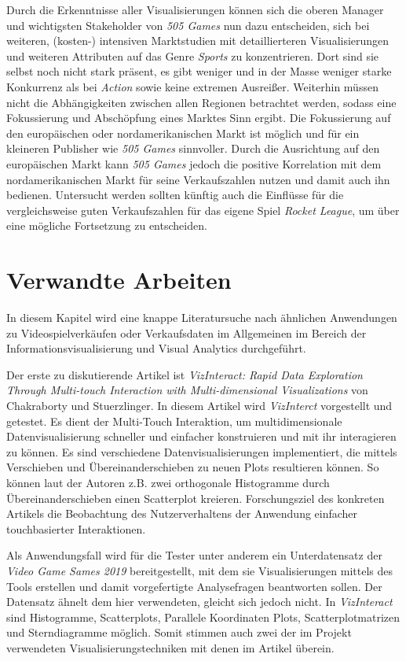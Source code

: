 \documentclass[usegeometry=true]{scrartcl}
\begin{document}
Durch die Erkenntnisse aller Visualisierungen können sich die oberen Manager und wichtigsten Stakeholder von \textit{505 Games} nun dazu entscheiden, sich bei weiteren, (kosten-) intensiven Marktstudien mit detaillierteren Visualisierungen und weiteren Attributen auf das Genre \textit{Sports} zu konzentrieren. 
Dort sind sie selbst noch nicht stark präsent, es gibt weniger und in der Masse weniger starke Konkurrenz als bei \textit{Action} sowie keine extremen Ausreißer. 
Weiterhin müssen nicht die Abhängigkeiten zwischen allen Regionen betrachtet werden, sodass eine Fokussierung und Abschöpfung eines Marktes Sinn ergibt. 
Die Fokussierung auf den europäischen oder nordamerikanischen Markt ist möglich und für ein kleineren Publisher wie \textit{505 Games} sinnvoller. 
Durch die Ausrichtung auf den europäischen Markt kann \textit{505 Games} jedoch die positive Korrelation mit dem nordamerikanischen Markt für seine Verkaufszahlen nutzen und damit auch ihn bedienen.
Untersucht werden sollten künftig auch die Einflüsse für die vergleichsweise guten Verkaufszahlen für das eigene Spiel \textit{Rocket League}, um über eine mögliche Fortsetzung zu entscheiden.
 
\section{Verwandte Arbeiten}
In diesem Kapitel wird eine knappe Literatursuche nach ähnlichen Anwendungen zu Videospielverkäufen oder Verkaufsdaten im Allgemeinen im Bereich der Informationsvisualisierung und Visual Analytics durchgeführt. 

Der erste zu diskutierende Artikel ist \textit{VizInteract: Rapid Data Exploration Through Multi-touch Interaction with Multi-dimensional Visualizations} von Chakraborty und Stuerzlinger.\cite{Chakraborty.2021}
In diesem Artikel wird \textit{VizInterct} vorgestellt und getestet. 
Es dient der Multi-Touch Interaktion, um multidimensionale Datenvisualisierung schneller und einfacher konstruieren und mit ihr interagieren zu können.
Es sind verschiedene Datenvisualisierungen implementiert, die mittels Verschieben und Übereinanderschieben zu neuen Plots resultieren können. 
So können laut der Autoren z.B. zwei orthogonale Histogramme durch Übereinanderschieben einen Scatterplot kreieren. 
Forschungsziel des konkreten Artikels die Beobachtung des Nutzerverhaltens der Anwendung einfacher touchbasierter Interaktionen.

Als Anwendungsfall wird für die Tester unter anderem ein Unterdatensatz der \textit{Video Game Sames 2019} bereitgestellt, mit dem sie Visualisierungen mittels des Tools erstellen und damit vorgefertigte Analysefragen beantworten sollen.
Der Datensatz ähnelt dem hier verwendeten, gleicht sich jedoch nicht. 
In \textit{VizInteract} sind Histogramme, Scatterplots, Parallele Koordinaten Plots, Scatterplotmatrizen und Sterndiagramme möglich. 
Somit stimmen auch zwei der im Projekt verwendeten Visualisierungstechniken mit denen im Artikel überein. 
\end{document}
